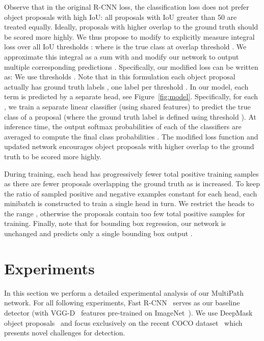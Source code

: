\documentclass{bmvc2k}
\newcommand{\fig}[1]{Figure~\ref{fig:#1}}
\begin{document}
Observe that in the original R-CNN loss, the classification loss  does not prefer object proposals with high IoU: all proposals with IoU greater than 50 are treated equally. Ideally, proposals with higher overlap to the ground truth should be scored more highly. We thus propose to modify  to explicitly measure integral loss over all IoU thresholds :
where  is the true class at overlap threshold . We approximate this integral as a sum with  and modify our network to output multiple corresponding predictions . Specifically, our modified loss can be written as:
We use  thresholds . Note that in this formulation each object proposal actually has  ground truth labels , one label per threshold . In our model, each term  is predicted by a separate head, see \fig{model}. Specifically, for each , we train a separate linear classifier (using shared features) to predict the true class  of a proposal (where the ground truth label is defined using threshold ). At inference time, the output softmax probabilities  of each of the  classifiers are averaged to compute the final class probabilities . The modified loss function and updated network encourages object proposals with higher overlap to the ground truth to be scored more highly.

During training, each head has progressively fewer total positive training samples as there are fewer proposals overlapping the ground truth as  is increased. To keep the ratio of sampled positive and negative examples constant for each head, each minibatch is constructed to train a single head in turn. We restrict the heads to the range , otherwise the proposals contain too few total positive samples for training. Finally, note that for bounding box regression, our network is unchanged and predicts only a single bounding box output .

\section{Experiments}\label{sec:results}

In this section we perform a detailed experimental analysis of our MultiPath network. For all following experiments, Fast R-CNN~\cite{girshick15fastrcnn} serves as our baseline detector (with VGG-D~\cite{Simonyan15} features pre-trained on ImageNet~\cite{imagenet_cvpr09}). We use DeepMask object proposals~\cite{pinheiro2015learning, pinheiro2016refining} and focus exclusively on the recent COCO dataset~\cite{mscoco2015} which presents novel challenges for detection.
\end{document}
